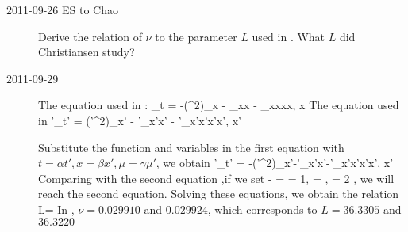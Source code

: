 \begin{description}

\item[2011-09-26 ES to Chao] Derive the relation of $\nu$ to the parameter
$L$ used in . What $L$ did Christiansen \etal{}
study?

\item[2011-09-29]                                               \toCB
The equation used in :
\beq
\mu_t = -(\mu^2)_x - \mu_{xx} - \mu_{xxxx}, x \in [0,L]
\eeq
The equation used in \etal{}
\beq
\mu'_{t'} = (\mu'^2)_{x'} - \mu'_{x'x'} - \nu\mu'_{x'x'x'x'}, x' \in [0,2\pi]
\eeq

Substitute the function and variables in the first equation with $t=\alpha t', x=\beta x', \mu=\gamma \mu'$,
we obtain
\beq
{}\mu'_{t'} = -\frac{\gamma}{\beta}(\mu'^2)_{x'}-\mu'_{x'x'}-\mu'_{x'x'x'x'}, x' 
\eeq
Comparing with the second equation ,if we set
\beq
-\frac{\alpha\gamma}{\beta} =  = 1,
   = \nu,    = 2\pi
\eeq, we will reach the second equation. Solving these equations, we obtain the relation
\beq L=\frac{2\pi}{\sqrt{\nu}}\eeq
In , $\nu = 0.029910$ and $0.029924$, which corresponds to $L = 36.3305$ and $36.3220$

\end{description}

